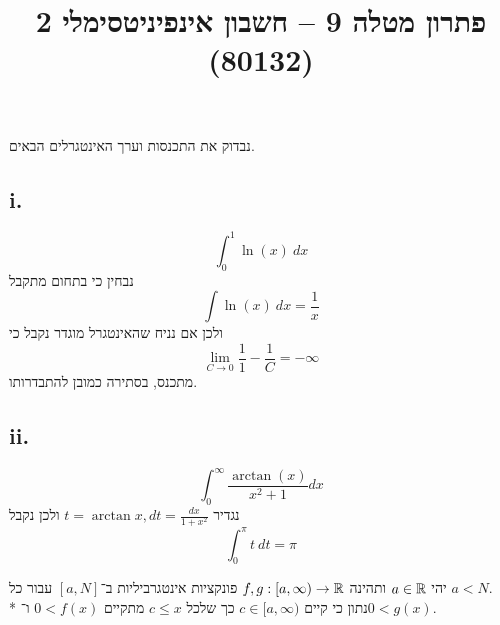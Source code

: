 
\usepackage{tikz}
\DeclareMathOperator\arcsinh{arcsinh}
\title{פתרון מטלה 9 – חשבון אינפיניטסימלי 2 (80132)}


\maketitle
\maketitleprint{}

\Question{}
נבדוק את התכנסות וערך האינטגרלים הבאים.

\subsection{i.}
\[
	\int_{0}^{1} \ln(x)\ dx
\]
נבחין כי בתחום מתקבל
\[
	\int \ln(x)\ dx = \frac{1}{x}
\]
ולכן אם נניח שהאינטגרל מוגדר נקבל כי
\[
	\lim_{C \to 0} \frac{1}{1} - \frac{1}{C} = -\infty
\]
מתכנס, בסתירה כמובן להתבדרותו.

\subsection{ii.}
\[
	\int_{0}^{\infty} \frac{\arctan(x)}{x^2 + 1} dx
\]
נגדיר $t = \arctan x, dt = \frac{dx}{1 + x^2}$ ולכן נקבל
\[
	\int_{0}^{\pi} t\ dt = \pi
\]

\Question{}
יהי $a \in \mathbb{R}$ ותהינה $f, g : [a, \infty) \to \mathbb{R}$ פונקציות אינטגרביליות ב־$[a, N]$ עבור כל $a < N$. \\* %
נתון כי קיים $c \in [a, \infty)$ כך שלכל $c \le x$ מתקיים $0 < f(x)$ ו־$0 < g(x)$. %

